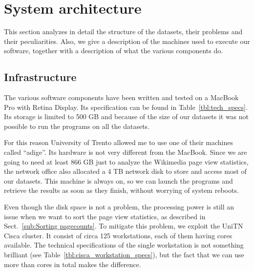
\chapter{System architecture}
\label{cha:system_architecture}
This section analyzes in detail the structure of the datasets, their problems and their peculiarities.
Also, we give a description of the machines used to execute our software, together with a description of what the various components do.

\section{Infrastructure}
\label{sec:infrastructure}
The various software components have been written and tested on a MacBook Pro with Retina Display.
Its specification can be found in Table~\ref{tbl:tech_specs}.
Its storage is limited to 500 GB and because of the size of our datasets it was not possible to run the programs on all the datasets.

For this reason University of Trento allowed me to use one of their machines called ``adige''.
Its hardware is not very different from the MacBook.
Since we are going to need at least 866 GB just to analyze the Wikimedia page view statistics, the network office also allocated a 4 TB network disk to store and access most of our datasets.
This machine is always on, so we can launch the programs and retrieve the results as soon as they finish, without worrying of system reboots.

Even though the disk space is not a problem, the processing power is still an issue when we want to sort the page view statistics, as described in Sect.~\ref{sub:Sorting pagecounts}.
To mitigate this problem, we exploit the UniTN Cisca cluster.
It consist of circa 125 workstations, each of them having  cores available.
The technical specifications of the single workstation is not something brilliant (see Table~\ref{tbl:cisca_workstation_specs}), but the fact that we can use more than  cores in total makes the difference.

